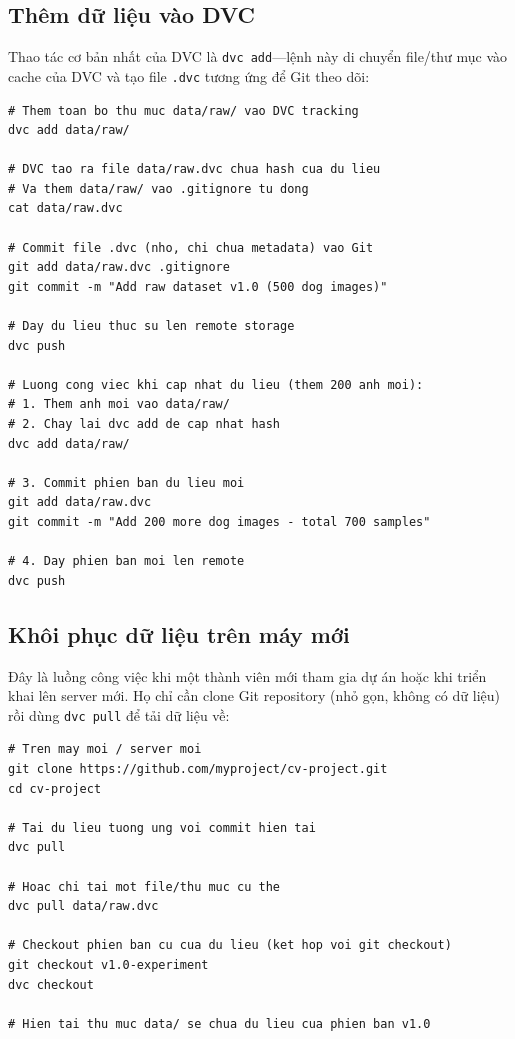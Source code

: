 \subsection{Thêm dữ liệu vào DVC}
\label{subsec:dvc_add_data}

Thao tác cơ bản nhất của DVC là \texttt{dvc add}---lệnh này di chuyển file/thư mục vào cache của DVC và tạo file \texttt{.dvc} tương ứng để Git theo dõi:

\begin{verbatim}
# Them toan bo thu muc data/raw/ vao DVC tracking
dvc add data/raw/

# DVC tao ra file data/raw.dvc chua hash cua du lieu
# Va them data/raw/ vao .gitignore tu dong
cat data/raw.dvc

# Commit file .dvc (nho, chi chua metadata) vao Git
git add data/raw.dvc .gitignore
git commit -m "Add raw dataset v1.0 (500 dog images)"

# Day du lieu thuc su len remote storage
dvc push

# Luong cong viec khi cap nhat du lieu (them 200 anh moi):
# 1. Them anh moi vao data/raw/
# 2. Chay lai dvc add de cap nhat hash
dvc add data/raw/

# 3. Commit phien ban du lieu moi
git add data/raw.dvc
git commit -m "Add 200 more dog images - total 700 samples"

# 4. Day phien ban moi len remote
dvc push
\end{verbatim}

\subsection{Khôi phục dữ liệu trên máy mới}
\label{subsec:dvc_pull}

Đây là luồng công việc khi một thành viên mới tham gia dự án hoặc khi triển khai lên server mới. Họ chỉ cần clone Git repository (nhỏ gọn, không có dữ liệu) rồi dùng \texttt{dvc pull} để tải dữ liệu về:

\begin{verbatim}
# Tren may moi / server moi
git clone https://github.com/myproject/cv-project.git
cd cv-project

# Tai du lieu tuong ung voi commit hien tai
dvc pull

# Hoac chi tai mot file/thu muc cu the
dvc pull data/raw.dvc

# Checkout phien ban cu cua du lieu (ket hop voi git checkout)
git checkout v1.0-experiment
dvc checkout

# Hien tai thu muc data/ se chua du lieu cua phien ban v1.0
\end{verbatim}


